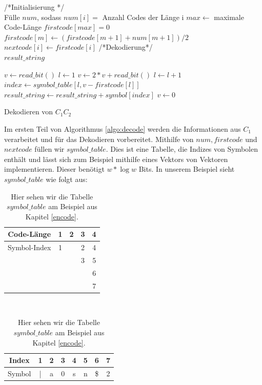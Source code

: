 \documentclass[a4paper,11pt]{scrartcl}%
\theoremstyle{change}
\theoremstyle{nonumberplain}
\theoremstyle{change}
\theoremstyle{nonumberplain}
\theoremstyle{change}
\theoremstyle{nonumberplain}
\begin{document}
\begin{algorithm}[!]
	\SetAlgoLined
	\SetAlgoNoEnd%
	/*Initialisierung */ \\
	Fülle $num$, sodass $num[i] =$ Anzahl Codes der Länge i\;
	$max \leftarrow$ maximale Code-Länge\;
	$firstcode[max] = 0$\;
	 {
		$firstcode[m] \leftarrow (firstcode[m+1] + num[m+1])/2$\;
	}
	 {
		$nextcode[i] \leftarrow firstcode[i]$\;
	}
	/*Dekodierung*/ \\
	$result\_string$\;
	
	 {
		$v \leftarrow read\_bit()$
		$l \leftarrow 1$\;
		 {
			$v \leftarrow 2 * v + read\_bit()$\;
			$l \leftarrow l + 1$\;
		}
		$index\leftarrow symbol\_table[l, v - firstcode[l]]$\;
		$result\_string \leftarrow result\_string + symbol[index]$\; 
		$v \leftarrow 0$\;
	}
	\caption{Dekodieren von $C_1C_2$ \cite[S. 339]{managingGigabytes}}	
	\label{algo:decode}
\end{algorithm}

Im ersten Teil von Algorithmus \ref{algo:decode} werden die Informationen aus $C_1$ verarbeitet und für das Dekodieren vorbereitet. 
Mithilfe von $num, firstcode$ und $ nextcode$ füllen wir $symbol\_table$. Dies ist eine Tabelle, die Indizes von Symbolen enthält und lässt sich zum Beispiel mithilfe eines Vektors von Vektoren implementieren. Dieser benötigt $w * \log w$ Bits. In unserem Beispiel sieht $symbol\_table$ wie folgt aus:

\begin{table}[h]
		\begin{center}
		
		\begin{tabular}[h]{|c|c|c|c|c|}\hline
			Code-Länge & 1 & 2 & 3 & 4  \\ \hline
 		 	Symbol-Index & 1 & & 2 & 4 \\ 
 		 	&  & & 3 & 5 \\ 
 		 	&  & &  & 6 \\ 
 		 	&  & &  & 7 \\ \hline
		\end{tabular} \\
		\vspace{5px}
		\begin{tabular}[h]{|c|c|c|c|c|c|c|c|} \hline
		Index  & 1 & 2 & 3 & 4 & 5 & 6 & 7 \\ \hline
		Symbol & | & a & 0 & s & n & \$ & 2 \\ \hline	
		\end{tabular}
		
		\end{center} 
		
		\caption{Hier sehen wir die Tabelle $symbol\_table$ am Beispiel aus Kapitel \ref{encode}. }
\end{table}
\end{document}
